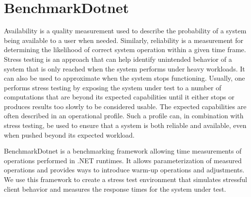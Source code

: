 \section{BenchmarkDotnet}
Availability is a quality measurement used to describe the probability of a system being available to a user when needed. Similarly, reliability is a measurement for determining the likelihood of correct system operation within a given time frame. \cite{reliabilityAvailability}
Stress testing is an approach that can help identify unintended behavior of a system that is only reached when the system performs under heavy workloads.
It can also be used to approximate when the system stops functioning.
Usually, one performs stress testing by exposing the system under test to a number of computations that are beyond its expected capabilities until it either stops or produces results too slowly to be considered usable\cite{Sommerville10}.
The expected capabilities are often described in an operational profile\cite{OperationalProfiles}.
Such a profile can, in combination with stress testing, be used to ensure that a system is both reliable and available, even when pushed beyond its expected workload.

BenchmarkDotnet\cite{Benchmarkdotnet} is a benchmarking framework allowing time measurements of operations performed in .NET runtimes.
It allows parameterization of measured operations and provides ways to introduce warm-up operations and adjustments.
We use this framework to create a stress test environment that simulates stressful client behavior and measures the response times for the system under test.